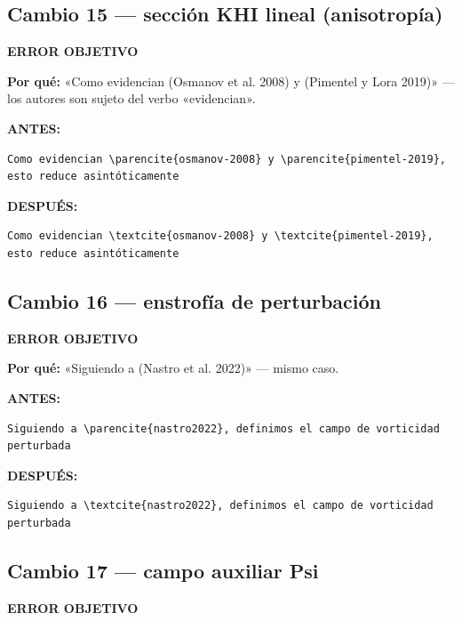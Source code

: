 \documentclass[11pt,a4paper]{article}
\begin{document}
\subsection*{Cambio 15 --- sección KHI lineal (anisotropía)}
\colorbox{okbg}{\textbf{\footnotesize ERROR OBJETIVO}}

\textbf{Por qué:} «Como evidencian (Osmanov et al. 2008) y (Pimentel y Lora 2019)» — los autores son sujeto del verbo «evidencian».

\textcolor{antesline}{\textbf{ANTES:}}
\begin{Verbatim}[breaklines=true, breakanywhere=true, fontsize=\small, frame=leftline, rulecolor=\color{antesline}, framerule=1.2pt]
Como evidencian \parencite{osmanov-2008} y \parencite{pimentel-2019}, esto reduce asintóticamente
\end{Verbatim}
\textcolor{despline}{\textbf{DESPUÉS:}}
\begin{Verbatim}[breaklines=true, breakanywhere=true, fontsize=\small, frame=leftline, rulecolor=\color{despline}, framerule=1.2pt]
Como evidencian \textcite{osmanov-2008} y \textcite{pimentel-2019}, esto reduce asintóticamente
\end{Verbatim}

\subsection*{Cambio 16 --- enstrofía de perturbación}
\colorbox{okbg}{\textbf{\footnotesize ERROR OBJETIVO}}

\textbf{Por qué:} «Siguiendo a (Nastro et al. 2022)» — mismo caso.

\textcolor{antesline}{\textbf{ANTES:}}
\begin{Verbatim}[breaklines=true, breakanywhere=true, fontsize=\small, frame=leftline, rulecolor=\color{antesline}, framerule=1.2pt]
Siguiendo a \parencite{nastro2022}, definimos el campo de vorticidad perturbada
\end{Verbatim}
\textcolor{despline}{\textbf{DESPUÉS:}}
\begin{Verbatim}[breaklines=true, breakanywhere=true, fontsize=\small, frame=leftline, rulecolor=\color{despline}, framerule=1.2pt]
Siguiendo a \textcite{nastro2022}, definimos el campo de vorticidad perturbada
\end{Verbatim}

\subsection*{Cambio 17 --- campo auxiliar Psi}
\colorbox{okbg}{\textbf{\footnotesize ERROR OBJETIVO}}
\end{document}
